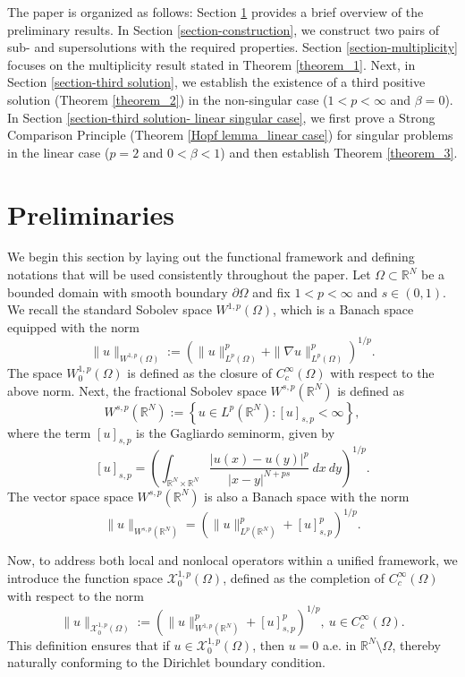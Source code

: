\documentclass[reqno,oneside]{amsart}
\theoremstyle{definition}
\theoremstyle{remark}
\numberwithin{equation}{section}
\newcommand{\ba}{\beta}
\newcommand{\Om} {\Omega}
\newcommand{\pa}{\partial}
\newcommand{\sr}{\mathbb{R}}
\newcommand{\na} {\nabla}
\newcommand{\wop}{W^{1,p}_0 (\Omega)}
\newcommand{\test}{C_c^{\infty} (\Om)}
\newcommand{\bdry}{\mathbb{R}^N \setminus \Omega}
\begin{document}
The paper is organized as follows: Section \ref{section-preliminaries} provides a brief overview of the preliminary results. In Section \ref{section-construction}, we construct two pairs of sub- and supersolutions with the required properties. Section \ref{section-multiplicity} focuses on the multiplicity result stated in Theorem \ref{theorem_1}. Next, in Section \ref{section-third solution}, we establish the existence of a third positive solution (Theorem \ref{theorem_2}) in the non-singular case ($1<p<\infty$ and $\ba =0$). In Section \ref{section-third solution- linear singular case}, we first prove a Strong Comparison Principle (Theorem \ref{Hopf lemma_linear case}) for singular problems in the linear case ($p=2$ and $0<\beta<1$) and then establish Theorem \ref{theorem_3}.


\section{Preliminaries}\label{section-preliminaries}

We begin this section by laying out the functional framework and defining notations that will be used consistently throughout the paper. Let $\Om \subset \sr^N$ be a bounded domain with smooth boundary $\pa\Om$ and fix $1<p<\infty$ and $s\in(0,1)$. We recall the standard Sobolev space $W^{1,p}(\Om)$, which is a Banach space equipped with the norm
\[\|u\|_{W^{1,p}(\Om)}:= \left(\|u\|^p_{L^p(\Om)} + \|\na u\|^p_{L^p(\Om)} \right)^{1/p}.\]
The space $\wop$ is defined as the closure of $\test$ with respect to the above norm. Next, the fractional Sobolev space $W^{s,p}(\sr^N)$ is defined as
\[W^{s,p}(\sr^N):= \left\{ u\in L^p(\sr^N): [u]_{s,p} < \infty \right\}, \]
where the term $[u]_{s,p}$ is the Gagliardo seminorm, given by
\[[u]_{s,p} = \left( \int_{\sr^N \times \sr^N} \frac{|u(x)-u(y)|^p}{|x-y|^{N+ps}}\ dx\ dy \right)^{1/p}.\]
The vector space space $W^{s,p}(\sr^N)$ is also a Banach space with the norm
\[\|u\|_{W^{s,p}(\sr^N)} = \left(\|u\|^p_{L^p(\sr^N)} + [u]^p_{s,p} \right)^{1/p}.\]

Now, to address both local and nonlocal operators within a unified framework, we introduce the function space $\mathcal{X}^{1,p}_0(\Om)$, defined as the completion of $\test$ with respect to the norm
\[\|u\|_{\mathcal{X}^{1,p}_0(\Om)}:= \left( \|u\|^p_{W^{1,p}(\sr^N)} + [u]^p_{s,p} \right)^{1/p},\ u\in\test.\]
This definition ensures that if $u\in \mathcal{X}^{1,p}_0(\Om)$, then $u=0$ a.e. in $\bdry$, thereby naturally conforming to the Dirichlet boundary condition.
\end{document}
